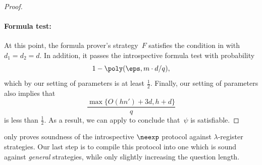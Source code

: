 \documentclass[11pt]{article}
\begin{document}
\begin{proof}
\paragraph{Formula test:}
At this point, the formula prover's strategy~$F$ satisfies the condition in  with $d_1 = d_2 = d$.
In addition, it passes the introspective formula test with probability
\begin{equation}\label{eq:formula-success-probability}
1-\poly(\eps, m \cdot d/q),
\end{equation}
which by our setting of parameters is at least $\tfrac{1}{2}$.
Finally, our setting of parameters also implies that
\begin{equation}\label{eq:other-expression-dont-even-know-what-to-call-this}
\frac{\max\{O(h n') + 3d, h + d\}}{q}
\end{equation}
is less than $\tfrac{1}{2}$.
As a result, we can apply  to conclude that~$\psi$ is satisfiable.
\end{proof}

 only proves soundness of the introspective $\neexp$ protocol against $\lambda$-register strategies.
Our last step is to compile this protocol into one which is sound against \emph{general} strategies,
while only slightly increasing the question length.
\end{document}

